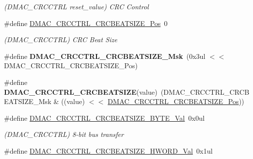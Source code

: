 \begin{DoxyCompactItemize}
\begin{DoxyCompactList}\small\item\em (D\+M\+A\+C\+\_\+\+C\+R\+C\+C\+T\+R\+L reset\+\_\+value) C\+R\+C Control \end{DoxyCompactList}\item 
\hypertarget{group___s_a_m_l21___d_m_a_c_ga363d4ea6d48fb9ce3a6c80e3be967852}{}\#define \hyperlink{group___s_a_m_l21___d_m_a_c_ga363d4ea6d48fb9ce3a6c80e3be967852}{D\+M\+A\+C\+\_\+\+C\+R\+C\+C\+T\+R\+L\+\_\+\+C\+R\+C\+B\+E\+A\+T\+S\+I\+Z\+E\+\_\+\+Pos}~0\label{group___s_a_m_l21___d_m_a_c_ga363d4ea6d48fb9ce3a6c80e3be967852}

\begin{DoxyCompactList}\small\item\em (D\+M\+A\+C\+\_\+\+C\+R\+C\+C\+T\+R\+L) C\+R\+C Beat Size \end{DoxyCompactList}\item 
\hypertarget{group___s_a_m_l21___d_m_a_c_ga415ba82f52f569ca987ee0fafcef92c4}{}\#define {\bfseries D\+M\+A\+C\+\_\+\+C\+R\+C\+C\+T\+R\+L\+\_\+\+C\+R\+C\+B\+E\+A\+T\+S\+I\+Z\+E\+\_\+\+Msk}~(0x3ul $<$$<$ D\+M\+A\+C\+\_\+\+C\+R\+C\+C\+T\+R\+L\+\_\+\+C\+R\+C\+B\+E\+A\+T\+S\+I\+Z\+E\+\_\+\+Pos)\label{group___s_a_m_l21___d_m_a_c_ga415ba82f52f569ca987ee0fafcef92c4}

\item 
\hypertarget{group___s_a_m_l21___d_m_a_c_ga1f4897d6ab1e5c277e2d5e080cb6287e}{}\#define {\bfseries D\+M\+A\+C\+\_\+\+C\+R\+C\+C\+T\+R\+L\+\_\+\+C\+R\+C\+B\+E\+A\+T\+S\+I\+Z\+E}(value)~(D\+M\+A\+C\+\_\+\+C\+R\+C\+C\+T\+R\+L\+\_\+\+C\+R\+C\+B\+E\+A\+T\+S\+I\+Z\+E\+\_\+\+Msk \& ((value) $<$$<$ \hyperlink{group___s_a_m_l21___d_m_a_c_ga363d4ea6d48fb9ce3a6c80e3be967852}{D\+M\+A\+C\+\_\+\+C\+R\+C\+C\+T\+R\+L\+\_\+\+C\+R\+C\+B\+E\+A\+T\+S\+I\+Z\+E\+\_\+\+Pos}))\label{group___s_a_m_l21___d_m_a_c_ga1f4897d6ab1e5c277e2d5e080cb6287e}

\item 
\hypertarget{group___s_a_m_l21___d_m_a_c_gafb441226141142da141437a86846bfc9}{}\#define \hyperlink{group___s_a_m_l21___d_m_a_c_gafb441226141142da141437a86846bfc9}{D\+M\+A\+C\+\_\+\+C\+R\+C\+C\+T\+R\+L\+\_\+\+C\+R\+C\+B\+E\+A\+T\+S\+I\+Z\+E\+\_\+\+B\+Y\+T\+E\+\_\+\+Val}~0x0ul\label{group___s_a_m_l21___d_m_a_c_gafb441226141142da141437a86846bfc9}

\begin{DoxyCompactList}\small\item\em (D\+M\+A\+C\+\_\+\+C\+R\+C\+C\+T\+R\+L) 8-\/bit bus transfer \end{DoxyCompactList}\item 
\hypertarget{group___s_a_m_l21___d_m_a_c_gae74b5936060eee5d0a25c70cbc863990}{}\#define \hyperlink{group___s_a_m_l21___d_m_a_c_gae74b5936060eee5d0a25c70cbc863990}{D\+M\+A\+C\+\_\+\+C\+R\+C\+C\+T\+R\+L\+\_\+\+C\+R\+C\+B\+E\+A\+T\+S\+I\+Z\+E\+\_\+\+H\+W\+O\+R\+D\+\_\+\+Val}~0x1ul\label{group___s_a_m_l21___d_m_a_c_gae74b5936060eee5d0a25c70cbc863990}


\end{DoxyCompactItemize}
